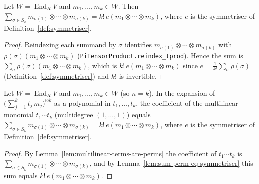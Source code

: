 \begin{lemma}
    \label{lem:sum-perm-eq-symmetriser}
    Let $W = \operatorname{End}_R V$ and $m_1, \ldots, m_k \in W$. Then
    $\sum_{\sigma \in S_k} m_{\sigma(1)} \otimes \cdots \otimes m_{\sigma(k)} =
    k!\, e(m_1 \otimes \cdots \otimes m_k)$, where $e$ is the symmetriser of
    Definition~\ref{def:symmetriser}.
\end{lemma}
\begin{proof}
    Reindexing each summand by $\sigma$ identifies $m_{\sigma(1)} \otimes \cdots \otimes m_{\sigma(k)}$ with
    $\rho(\sigma)(m_1 \otimes \cdots \otimes m_k)$ (\texttt{PiTensorProduct.reindex\_tprod}). Hence the sum
    is $\sum_\sigma \rho(\sigma)(m_1 \otimes \cdots \otimes m_k)$, which is $k!\, e(m_1 \otimes \cdots
    \otimes m_k)$ since $e = \tfrac{1}{k!}\sum_\sigma \rho(\sigma)$ (Definition~\ref{def:symmetriser}) and
    $k!$ is invertible.
\end{proof}

\begin{lemma}
    \label{lem:multilinear-component}
    \leanok
    Let $W = \operatorname{End}_R V$ and $m_1, \ldots, m_k \in W$ (so $n = k$). In the expansion of
    $\bigl(\sum_{j=1}^{k} t_j\, m_j\bigr)^{\otimes k}$ as a polynomial in $t_1, \ldots, t_k$, the
    coefficient of the multilinear monomial $t_1 \cdots t_k$ (multidegree $(1,\ldots,1)$) equals
    $\sum_{\sigma \in S_k} m_{\sigma(1)} \otimes \cdots \otimes m_{\sigma(k)} =
    k!\, e(m_1 \otimes \cdots \otimes m_k)$, where $e$ is the symmetriser of
    Definition~\ref{def:symmetriser}.
\end{lemma}
\begin{proof}
    By Lemma~\ref{lem:multilinear-terms-are-perms} the coefficient of $t_1 \cdots t_k$ is
    $\sum_{\sigma \in S_k} m_{\sigma(1)} \otimes \cdots \otimes m_{\sigma(k)}$, and by
    Lemma~\ref{lem:sum-perm-eq-symmetriser} this sum equals $k!\, e(m_1 \otimes \cdots \otimes m_k)$.
\end{proof}


